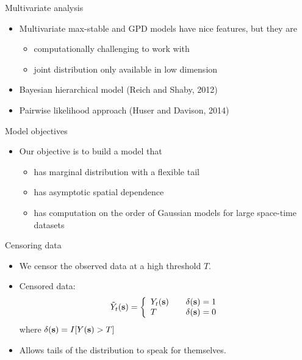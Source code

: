 \documentclass{beamer}
\begin{document}
\begin{frame}{Multivariate analysis}
  \begin{itemize} \setlength{\itemsep}{0.5em}
    \item Multivariate max-stable and GPD models have nice features, but they are
    \begin{itemize}
      \item computationally challenging to work with
      \item joint distribution only available in low dimension
    \end{itemize}
    \item Bayesian hierarchical model (Reich and Shaby, 2012)
    \item Pairwise likelihood approach (Huser and Davison, 2014)
  \end{itemize}
\end{frame}

\begin{frame}{Model objectives}
  \begin{itemize} \setlength{\itemsep}{0.5em}
    \item Our objective is to build a model that
    \begin{itemize}
      \item has marginal distribution with a flexible tail
      \item has asymptotic spatial dependence
      \item has computation on the order of Gaussian models for large space-time datasets
    \end{itemize}
  \end{itemize}
\end{frame}

\begin{frame}{Censoring data}
  \begin{itemize} \setlength{\itemsep}{0.5em}
    \item We censor the observed data at a high threshold $T$.
    \item Censored data:
    \begin{align*}
      \tilde{Y}_t(\mbox{\bf s}) = \left\{ \begin{array}{ll}
          Y_t(\mbox{\bf s}) \quad & \delta(\mbox{\bf s}) = 1\\
          T \quad & \delta(\mbox{\bf s}) = 0
      \end{array}\right.
    \end{align*}
    where $\delta(\mbox{\bf s}) = I[Y(\mbox{\bf s}) > T]$
    \item Allows tails of the distribution to speak for themselves.
  \end{itemize}
\end{frame}
\end{document}

